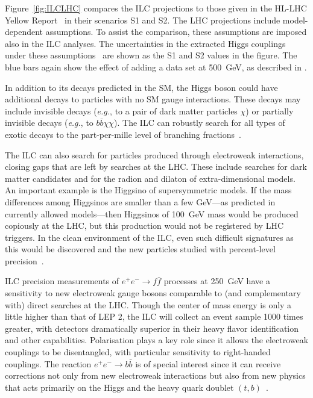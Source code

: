 \documentclass[%
reprint,
 floatfix,
 amsmath,amssymb,
 aps,
]{revtex4-1}
\def\eg{{\it e.g.}}
\def\ee{e^+e^-}
\begin{document}
Figure~\ref{fig:ILCLHC} compares the ILC projections to those given in the
HL-LHC Yellow Report~\cite{Yellow} in their scenarios S1
and S2. The LHC projections include
model-dependent assumptions.  To assist the comparison,
these assumptions are imposed also in the ILC analyses. The 
uncertainties in the extracted Higgs couplings under these 
assumptions~\cite{ILCforESS} are shown as the  S1 and S2 values in the figure. The blue bars again show the effect of adding a data set at 
500~GeV, as described in \cite{ILCforESS}.


In addition to its decays predicted in the SM, the Higgs boson could have additional decays 
to particles with no SM gauge interactions.    These decays may
include invisible decays (\eg, to a pair of dark matter particles $\chi$)  or
partially invisible decays (\eg, to $b\bar b \chi \chi$).   The ILC
can robustly search for all types of exotic decays  to the 
part-per-mille level of branching fractions~\cite{Liu:2016zki}.

The ILC can also search for particles produced through electroweak
interactions, closing gaps that are left by searches at the LHC. These include searches for dark matter candidates and for the radion and dilaton of extra-dimensional models. An
important example is the Higgsino of supersymmetric models.   If the
mass  differences among Higgsinos are smaller than a few GeV---as predicted in currently allowed models---then Higgsinos
of 100~GeV mass would be produced copiously at the LHC, but this
production would not be registered by LHC triggers.  In the clean
environment 
of the ILC, even such difficult signatures as this 
would be discovered and the new particles 
studied with percent-level precision~\cite{Higgsino}.

ILC precision measurements of $\ee\to f\bar f$ processes at 250~GeV have a sensitivity to new
electroweak gauge bosons comparable to (and complementary with) 
direct searches at the LHC. Though the center of mass energy is only a little higher than that of LEP 2, the ILC will collect an event sample 1000 times greater, with detectors dramatically superior in their heavy flavor identification and other capabilities.  Polarisation plays a
key role since it allows  the electroweak couplings to be
disentangled, with particular 
sensitivity to right-handed couplings.   The reaction $\ee\to b\bar b$ 
is of special interest since it can receive corrections not only from new electroweak interactions but also from new physics 
that acts primarily on the Higgs and the heavy quark doublet $(t,b)$~\cite{eetobb1,eetobb2}. 
\end{document}
